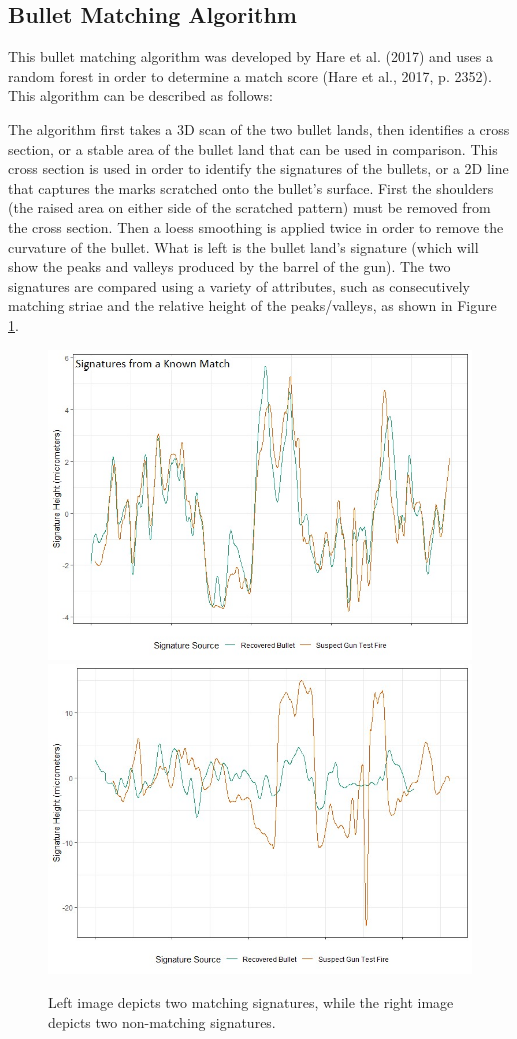 \documentclass[print]{nuthesis}
\begin{document}
\hypertarget{bullet-matching-algorithm}{%
\subsection{Bullet Matching Algorithm}\label{bullet-matching-algorithm}}

This bullet matching algorithm was developed by Hare et al. (2017) and uses a random forest in order to determine a match score (Hare et al., 2017, p. 2352).
This algorithm can be described as follows:

The algorithm first takes a 3D scan of the two bullet lands, then identifies a cross section, or a stable area of the bullet land that can be used in comparison.
This cross section is used in order to identify the signatures of the bullets, or a 2D line that captures the marks scratched onto the bullet's surface.
First the shoulders (the raised area on either side of the scratched pattern) must be removed from the cross section.
Then a loess smoothing is applied twice in order to remove the curvature of the bullet.
What is left is the bullet land's signature (which will show the peaks and valleys produced by the barrel of the gun).
The two signatures are compared using a variety of attributes, such as consecutively matching striae and the relative height of the peaks/valleys, as shown in Figure \ref{fig:signaturecompare}.

\begin{figure}

{\centering \includegraphics[width=0.49\linewidth]{images/Match_Signatures} \includegraphics[width=0.49\linewidth]{images/K995_NoMatch_Signatures} 

}

\caption{Left image depicts two matching signatures, while the right image depicts two non-matching signatures.}\label{fig:signaturecompare}
\end{figure}
\end{document}
